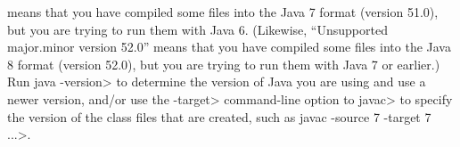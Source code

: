 means that you have compiled some files into the Java 7 format (version
51.0), but you are trying to run them with Java 6.
(Likewise, ``Unsupported major.minor version 52.0''
means that you have compiled some files into the Java 8 format (version
52.0), but you are trying to run them with Java 7 or earlier.)
Run \<java -version> to
determine the version of Java you are using and use a newer version,
and/or use the \<-target>
command-line option to \<javac> to specify the version of the class files
that are created, such as \<javac -source 7 -target 7 ...>.



%
% 
% 
% 
% 
% 
% 
% 
% 
